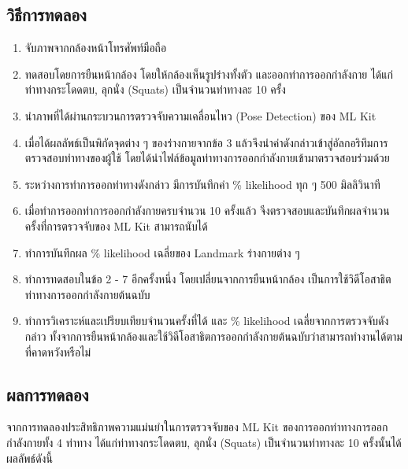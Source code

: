 \subsection{วิธีการทดลอง}
\begin{enumerate}
	\item จับภาพจากกล้องหน้าโทรศัพท์มือถือ
	\item ทดสอบโดยการยืนหน้ากล้อง โดยให้กล้องเห็นรูปร่างทั้งตัว และออกท่าการออกกำลังกาย ได้แก่ท่าทางกระโดดตบ, ลุกนั่ง (Squats) เป็นจำนวนท่าทางละ 10 ครั้ง
	\item นำภาพที่ได้ผ่านกระบวนการตรวจจับความเคลื่อนไหว (Pose Detection) ของ ML Kit
	\item เมื่อได้ผลลัพธ์เป็นพิกัดจุดต่าง ๆ ของร่างกายจากข้อ 3 แล้วจึงนำค่าดังกล่าวเข้าสู่อัลกอริทึมการตรวจสอบท่าทางของผู้ใช้ โดยได้นำไฟล์ข้อมูลท่าทางการออกกำลังกายเข้ามาตรวจสอบร่วมด้วย
	\item ระหว่างการทำการออกท่าทางดังกล่าว มีการบันทึกค่า \% likelihood ทุก ๆ 500 มิลลิวินาที
	\item เมื่อทำการออกท่าการออกกำลังกายครบจำนวน 10 ครั้งแล้ว จีงตรวจสอบและบันทึกผลจำนวนครั้งที่การตรวจจับของ ML Kit สามารถนับได้
	\item ทำการบันทึกผล \% likelihood เฉลี่ยของ Landmark ร่างกายต่าง ๆ
	\item ทำการทดสอบในข้อ 2 - 7 อีกครั้งหนึ่ง โดยเปลี่ยนจากการยืนหน้ากล้อง เป็นการใช้วิดีโอสาธิตท่าทางการออกกำลังกายต้นฉบับ
	\item ทำการวิเคราะห์และเปรียบเทียบจำนวนครั้งที่ได้ และ \% likelihood เฉลี่ยจากการตรวจจับดังกล่าว ทั้งจากการยืนหน้ากล้องและใช้วิดีโอสาธิตการออกกำลังกายต้นฉบับว่าสามารถทำงานได้ตามที่คาดหวังหรือไม่
\end{enumerate}
\subsection{ผลการทดลอง}
จากการทดลองประสิทธิภาพความแม่นยำในการตรวจจับของ ML Kit ของการออกท่าทางการออกกำลังกายทั้ง 4 ท่าทาง ได้แก่ท่าทางกระโดดตบ, ลุกนั่ง (Squats) เป็นจำนวนท่าทางละ 10 ครั้งนั้นได้ผลลัพธ์ดังนี้
